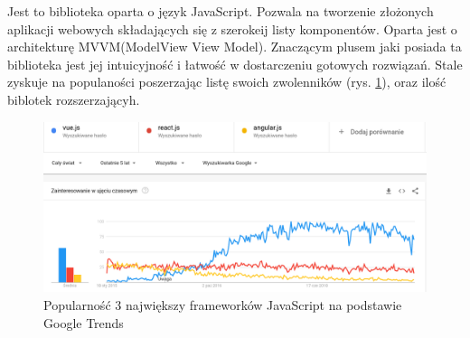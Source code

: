 Jest to biblioteka oparta o język JavaScript. Pozwala na tworzenie złożonych aplikacji webowych składających się z szerokeij listy komponentów.
Oparta jest o architekturę MVVM(ModelView View Model).
Znaczącym plusem jaki posiada ta biblioteka jest jej intuicyjność i łatwość w dostarczeniu gotowych rozwiązań.
Stale zyskuje na populaności poszerzając listę swoich zwolenników (rys. \ref{fig:vue}), oraz ilość biblotek rozszerzającyh.

\begin{figure}[H]
    \centering
    \includegraphics[width=6in]{images/vue.png}
    \caption{Popularność 3 największy frameworków JavaScript na podstawie Google Trends \label{fig:vue}}
\end{figure}
